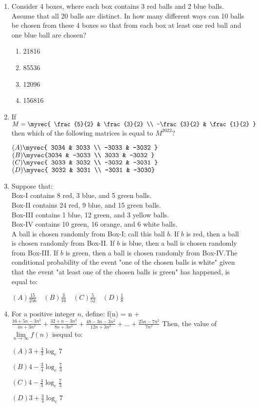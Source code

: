 \documentclass{article}
\begin{document}
\begin{enumerate}
    \item Consider 4 boxes, where each box contains 3 red balls and 2 blue balls. Assume that all 20 balls are distinct. In how many different ways can 10 balls be chosen from these 4 boxes so that from each box at least one red ball and one blue ball are chosen?

    \begin{enumerate}
        \item 21816
        \item 85536
        \item 12096
        \item 156816
    \end{enumerate}


 \item If 
$
M = \myvec{ 
\frac{5}{2} & \frac{3}{2} \\ 
-\frac{3}{2} & \frac{1}{2} 
}
$
then which of the following matrices is equal to \( M^{2022} \)?

$
(A) \myvec{ 3034 & 3033 \\ -3033 & -3032 }
$
$
(B) \myvec{3034 & -3033 \\ 3033 & -3032 }
$
$
(C) \myvec{ 3033 & 3032 \\ -3032 & -3031 }
$
$
(D) \myvec{ 3032 & 3031 \\ -3031 & -3030}
$



\item Suppose that:\\
Box-I contains 8 red, 3 blue, and 5 green balls.\\
Box-II contains 24 red, 9 blue, and 15 green balls.\\
Box-III contains 1 blue, 12 green, and 3 yellow balls.\\
Box-IV contains 10 green, 16 orange, and 6 white balls.\\
A ball is chosen randomly from Box-I; call this ball \( b \). If \( b \) is red, then a ball is chosen randomly from Box-II. If \( b \) is blue, then a ball is chosen randomly from Box-III. If \( b \) is green, then a ball is chosen randomly from Box-IV.The conditional probability of the event "one of the chosen balls is white" given that the event "at least one of the chosen balls is green" has happened, is equal to:

$
(A) \frac{15}{256} \quad (B) \frac{3}{16} \quad (C) \frac{5}{52} \quad (D) \frac{1}{8}
$

\item For a positive integer \( n \), define: f(n) = n + $\frac{16 + 5n - 3n^2}{4n + 3n^2} + \frac{32+ n - 3n^2}{8n + 3n^2} + \frac{48 - 3n - 3n^2}{12n + 3n^2} + \dots + \frac{25n - 7n^2}{7n^2}$
Then, the value of \( \lim\limits_{n \to \infty} f(n) \) isequal to:

$
(A) 3 + \frac{4}{3} \log_e 7
$

$
(B) 4 - \frac{3}{4} \log_e \frac{7}{3}
$

$
(C) 4 - \frac{4}{3} \log_e \frac{7}{3}
$

$
(D) 3 + \frac{3}{4} \log_e 7
$

\end{enumerate}
\end{document}
